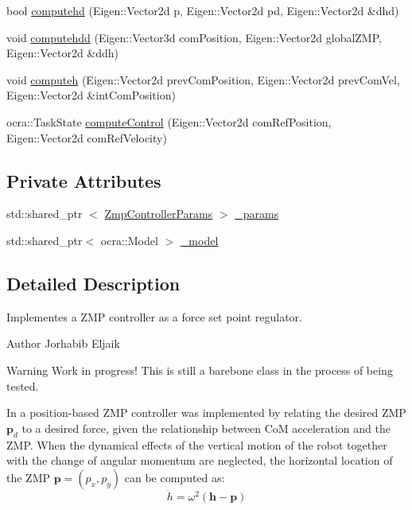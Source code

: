 \begin{DoxyCompactItemize}
\item 
bool \hyperlink{classZmpController_a5eab881a51fb2ace1a1d494171353bc7}{computehd} (\-Eigen\-::\-Vector2d p, \-Eigen\-::\-Vector2d pd, \-Eigen\-::\-Vector2d \&dhd)
\item 
void \hyperlink{classZmpController_aa450c67048a44fe0dfadf07cd30165e7}{computehdd} (\-Eigen\-::\-Vector3d com\-Position, \-Eigen\-::\-Vector2d global\-Z\-M\-P, \-Eigen\-::\-Vector2d \&ddh)
\item 
void \hyperlink{classZmpController_a3e275de73186b889c755e6dc618d29bf}{computeh} (\-Eigen\-::\-Vector2d prev\-Com\-Position, \-Eigen\-::\-Vector2d prev\-Com\-Vel, \-Eigen\-::\-Vector2d \&int\-Com\-Position)
\item 
ocra\-::\-Task\-State \hyperlink{classZmpController_a7cd490ac7bc0e360c0884cd40a346732}{compute\-Control} (\-Eigen\-::\-Vector2d com\-Ref\-Position, \-Eigen\-::\-Vector2d com\-Ref\-Velocity)
\end{DoxyCompactItemize}
\subsection*{\-Private \-Attributes}
\begin{DoxyCompactItemize}
\item 
std\-::shared\-\_\-ptr\*
$<$ \hyperlink{structZmpControllerParams}{\-Zmp\-Controller\-Params} $>$ \hyperlink{classZmpController_a59a45aafc8a49a0d49966f7ed061a022}{\-\_\-params}
\item 
std\-::shared\-\_\-ptr$<$ ocra\-::\-Model $>$ \hyperlink{classZmpController_ac86a58d1f870ce27c78b0f6d2294e05f}{\-\_\-model}
\end{DoxyCompactItemize}


\subsection{\-Detailed \-Description}
\-Implementes a \-Z\-M\-P controller as a force set point regulator. 

\begin{DoxyAuthor}{\-Author}
\-Jorhabib \-Eljaik
\end{DoxyAuthor}
\cite{krause2012stabilization}

\begin{DoxyWarning}{\-Warning}
\-Work in progress! \-This is still a barebone class in the process of being tested.
\end{DoxyWarning}
\-In \cite{krause2012stabilization} a position-\/based \-Z\-M\-P controller was implemented by relating the desired \-Z\-M\-P $ \mathbf{p}_d $ to a desired force, given the relationship between \-Co\-M acceleration and the \-Z\-M\-P. \-When the dynamical effects of the vertical motion of the robot together with the change of angular momentum are neglected, the horizontal location of the \-Z\-M\-P $\mathbf{p} = (p_x, p_y)$ can be computed as\-: \label{classZmpController_simplifiedZMP}%
\hypertarget{classZmpController_simplifiedZMP}{}%
 \begin{equation} \ddot{h} = \omega^2(\mathbf{h} - \mathbf{p}) \end{equation}

